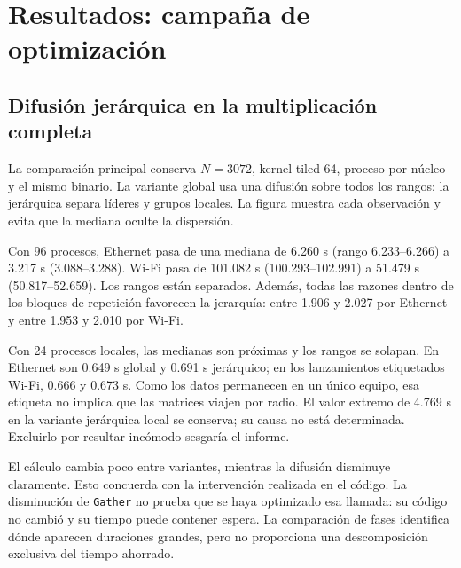\section{Resultados: campaña de optimización}\label{sec:opt}

\subsection{Difusión jerárquica en la multiplicación completa}

La comparación principal conserva $N=3072$, kernel tiled 64, proceso por núcleo y el mismo binario. La variante global usa una difusión sobre todos los rangos; la jerárquica separa líderes y grupos locales. La figura muestra cada observación y evita que la mediana oculte la dispersión.


Con 96 procesos, Ethernet pasa de una mediana de 6.260 s (rango 6.233--6.266) a 3.217 s (3.088--3.288). Wi-Fi pasa de 101.082 s (100.293--102.991) a 51.479 s (50.817--52.659). Los rangos están separados. Además, todas las razones dentro de los bloques de repetición favorecen la jerarquía: entre 1.906 y 2.027 por Ethernet y entre 1.953 y 2.010 por Wi-Fi.

Con 24 procesos locales, las medianas son próximas y los rangos se solapan. En Ethernet son 0.649 s global y 0.691 s jerárquico; en los lanzamientos etiquetados Wi-Fi, 0.666 y 0.673 s. Como los datos permanecen en un único equipo, esa etiqueta no implica que las matrices viajen por radio. El valor extremo de 4.769 s en la variante jerárquica local se conserva; su causa no está determinada. Excluirlo por resultar incómodo sesgaría el informe.

\begin{table}[H]\caption{Medianas de los máximos por fase con 96 procesos, en segundos. Cada columna se resume por separado; no se debe sumar para reconstruir el total.}\label{tab:fases-nuevas}

\end{table}

El cálculo cambia poco entre variantes, mientras la difusión disminuye claramente. Esto concuerda con la intervención realizada en el código. La disminución de \texttt{Gather} no prueba que se haya optimizado esa llamada: su código no cambió y su tiempo puede contener espera. La comparación de fases identifica dónde aparecen duraciones grandes, pero no proporciona una descomposición exclusiva del tiempo ahorrado.

